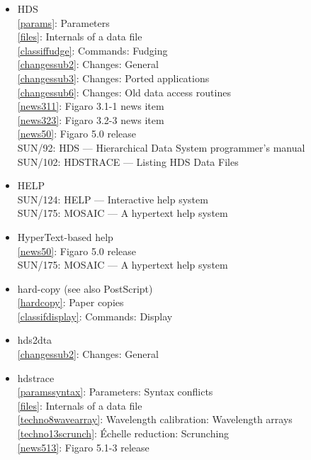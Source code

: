 \documentclass[11pt,twoside]{article}
\newcommand{\htmlref}[2]{#1}
\newcommand{\xref}[3]{#1}
\newcommand{\idxint}[2]{\ref{#1}: \htmlref{#2}{#1}}
\newcommand{\idxint}[2]{\htmlref{#2}{#1}}
\newcommand{\latorhtm}[2]{#1}
\newcommand{\latorhtm}[2]{#2}
\begin{document}
\begin{itemize}
\item HDS\\
   \idxint{params}{Parameters}\\
   \idxint{files}{Internals of a data file}\\
   \idxint{classiffudge}{Commands: Fudging}\\
   \idxint{changessub2}{Changes: General}\\
   \idxint{changessub3}{Changes: Ported applications}\\
   \idxint{changessub6}{Changes: Old data access routines}\\
   \idxint{news311}{Figaro 3.1-1 news item}\\
   \idxint{news323}{Figaro 3.2-3 news item}\\
   \idxint{news50}{Figaro 5.0 release}\\
   \xref{SUN/92: HDS \latorhtm{---}{-} Hierarchical Data System programmer's manual}{sun92}{}\\
   \xref{SUN/102: HDSTRACE \latorhtm{---}{-} Listing HDS Data Files}{sun102}{}
\item HELP\\
   \xref{SUN/124: HELP \latorhtm{---}{-} Interactive help system}{sun124}{}\\
   \xref{SUN/175: MOSAIC \latorhtm{---}{-} A hypertext help system}{sun175}{}
\item HyperText-based help\\
   \idxint{news50}{Figaro 5.0 release}\\
   \xref{SUN/175: MOSAIC \latorhtm{---}{-} A hypertext help system}{sun175}{}
\item hard-copy (see also PostScript)\\
   \idxint{hardcopy}{Paper copies}\\
   \idxint{classifdisplay}{Commands: Display}
\item hds2dta\\
   \idxint{changessub2}{Changes: General}
\item hdstrace\\
   \idxint{paramssyntax}{Parameters: Syntax conflicts}\\
   \idxint{files}{Internals of a data file}\\
   \idxint{techno8wavearray}{Wavelength calibration: Wavelength arrays}\\
   \idxint{techno13scrunch}{\'Echelle reduction: Scrunching}\\
   \idxint{news513}{Figaro 5.1-3 release}\\

\end{itemize}
\end{document}
